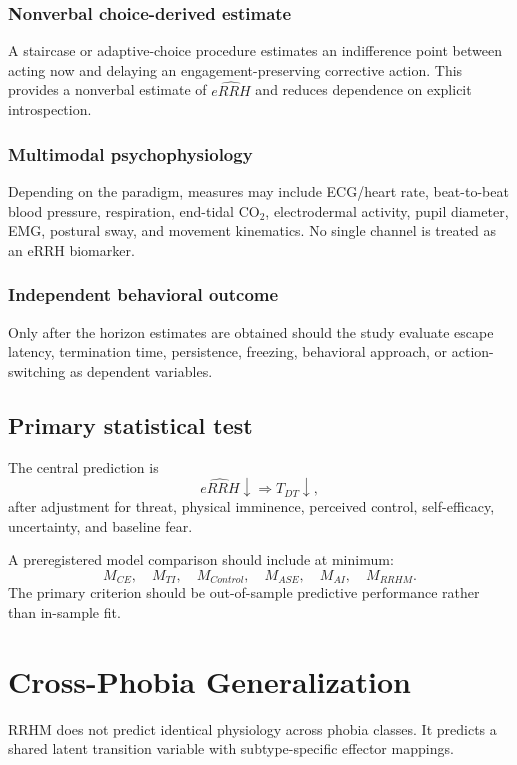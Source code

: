 \documentclass[11pt]{article}
\begin{document}
\subsubsection{Nonverbal choice-derived estimate}
A staircase or adaptive-choice procedure estimates an indifference point between acting now and delaying an engagement-preserving corrective action. This provides a nonverbal estimate of $\widehat{eRRH}$ and reduces dependence on explicit introspection.

\subsubsection{Multimodal psychophysiology}
Depending on the paradigm, measures may include ECG/heart rate, beat-to-beat blood pressure, respiration, end-tidal CO$_2$, electrodermal activity, pupil diameter, EMG, postural sway, and movement kinematics. No single channel is treated as an eRRH biomarker.

\subsubsection{Independent behavioral outcome}
Only after the horizon estimates are obtained should the study evaluate escape latency, termination time, persistence, freezing, behavioral approach, or action-switching as dependent variables.

\subsection{Primary statistical test}
The central prediction is
\[
\widehat{eRRH}\downarrow\Rightarrow T_{DT}\downarrow,
\]
after adjustment for threat, physical imminence, perceived control, self-efficacy, uncertainty, and baseline fear.

A preregistered model comparison should include at minimum:
\[
M_{CE},\quad M_{TI},\quad M_{Control},\quad M_{ASE},\quad M_{AI},\quad M_{RRHM}.
\]
The primary criterion should be out-of-sample predictive performance rather than in-sample fit.

\section{Cross-Phobia Generalization}
RRHM does not predict identical physiology across phobia classes. It predicts a shared latent transition variable with subtype-specific effector mappings.
\end{document}
